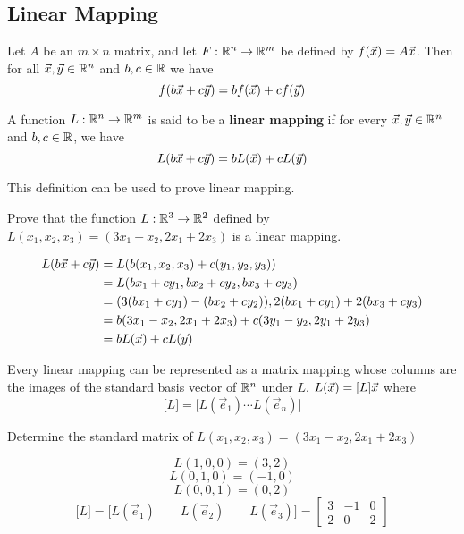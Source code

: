 \documentclass[english, 12pt]{article}
\begin{document}
\subsection{Linear Mapping}

\begin{thrm}
Let $A$ be an $m \times n$ matrix, and let $F: {\mathbb{R}}^n \rightarrow {\mathbb{R}}^m$ be defined by $f(\vec{x}) = A\vec{x}$. Then for all $\vec{x},\vec{y} \in {\mathbb{R}}^n$ and $b,c \in {\mathbb{R}}$ we have
\[f(b\vec{x} + c\vec{y}) = bf(\vec{x}) + cf(\vec{y})\]
\end{thrm}

\begin{defn}
A function $L : {\mathbb{R}}^n \rightarrow {\mathbb{R}}^m$ is said to be a \textbf{linear mapping} if for every $\vec{x},\vec{y} \in {\mathbb{R}}^n$ and $b,c \in {\mathbb{R}}$, we have
\[ L(b\vec{x} + c \vec{y}) = bL(\vec{x}) + cL(\vec{y})\]
\end{defn}

\begin{note}
This definition can be used to prove linear mapping.
\end{note}

\begin{exmp}
Prove that the function $L: {\mathbb{R}}^3 \rightarrow {\mathbb{R}}^2$ defined by $L(x_{1},x_{2},x_{3}) = (3x_{1} - x_{2},2x_{1} + 2 x_{3})$ is a linear mapping.
\begin{sol}
\begin{align*}
L(b\vec{x} + c \vec{y}) &= L(b(x_{1},x_{2},x_{3}) + c(y_{1},y_{2},y_{3})) \\
&= L( b x_{1} + c y_{1}, b x_{2} + c y _{2}, b x_{3} + c y_{3}) \\
&= (3 (b x_{1} + c y_{1}) - (b x_{2} + c y_{2})), 2 (b x_{1} + c y_{1}) + 2 (b x_{3} + c y_{3}) \\
&= b(3 x_{1} - x_{2}, 2 x_{1} + 2 x_{3}) + c (3 y_{1} - y_{2},2 y_{1} + 2 y_{3}) \\
&= bL(\vec{x}) + c L(\vec{y})
\end{align*}
\end{sol}
\end{exmp}

\begin{thrm}
Every linear mapping can be represented as a matrix mapping whose columns are the images of the standard basis vector of ${\mathbb{R}}^n$ under $L$. $L(\vec{x}) = \lbrack L \rbrack \vec{x}$ where
\[\lbrack L \rbrack = \lbrack L(\vec{e}_{1}) \cdots L(\vec{e}_{n}) \rbrack\]
\end{thrm}

\begin{exmp}
Determine the standard matrix of $L(x_{1},x_{2},x_{3}) = (3x_{1} - x_{2} , 2 x_{1} + 2 x_{3})$
\begin{sol}
\[L(1,0,0) = (3,2)\]
\[ L(0,1,0) = (-1,0)\]
\[L (0,0,1) = (0,2)\]
\[ \lbrack L \rbrack = \lbrack L(\vec{e}_{1}) \qquad L(\vec{e}_{2}) \qquad L(\vec{e}_{3}) \rbrack = \begin{bmatrix} 3 & -1 & 0 \\ 2 & 0 & 2 \end{bmatrix}\]
\end{sol}
\end{exmp}
\end{document}

